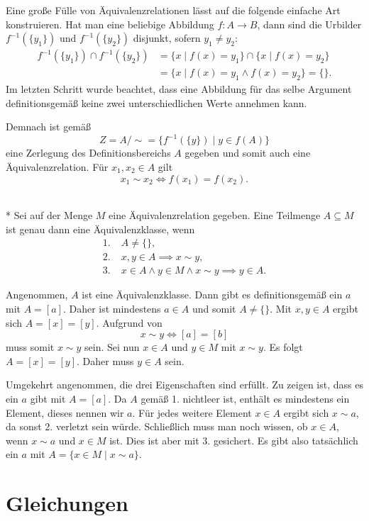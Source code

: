 Eine große Fülle von Äquivalenzrelationen lässt auf die folgende
einfache Art konstruieren. Hat man eine beliebige Abbildung
$f\colon A\to B$, dann sind die Urbilder $f^{-1}(\{y_1\})$ und
$f^{-1}(\{y_2\})$ disjunkt, sofern $y_1\ne y_2$:%
\begin{align*}
f^{-1}(\{y_1\})\cap f^{-1}(\{y_2\})
&= \{x\mid f(x)=y_1\}\cap\{x\mid f(x)=y_2\}\\
&= \{x\mid f(x)=y_1\land f(x)=y_2\} = \{\}.
\end{align*}
Im letzten Schritt wurde beachtet, dass eine Abbildung für
das selbe Argument definitionsgemäß keine zwei unterschiedlichen
Werte annehmen kann.

Demnach ist gemäß
\[Z = A/{\sim} = \{f^{-1}(\{y\})\mid y\in f(A)\}\]
eine Zerlegung des Definitionsbereichs $A$ gegeben und somit auch eine
Äquivalenzrelation. Für $x_1,x_2\in A$ gilt%
\[x_1\sim x_2 \iff f(x_1) = f(x_2).\]

\begin{Satz}\mbox{}\\*
Sei auf der Menge $M$ eine Äquivalenzrelation gegeben. Eine
Teilmenge $A\subseteq M$ ist genau dann eine Äquivalenzklasse,
wenn%
\begin{align*}
1.\;& A\ne\{\},\\
2.\;& x,y\in A\implies x\sim y,\\
3.\;& x\in A\land y\in M\land x\sim y\implies y\in A.
\end{align*}
\end{Satz}
 Angenommen, $A$ ist eine Äquivalenzklasse.
Dann gibt es definitionsgemäß ein $a$ mit $A=[a]$. Daher ist
mindestens $a\in A$ und somit $A\ne\{\}$. Mit $x,y\in A$ ergibt
sich $A=[x]=[y]$. Aufgrund von%
\[x\sim y \iff [a]=[b]\]
muss somit $x\sim y$ sein. Sei nun $x\in A$ und $y\in M$ mit
$x\sim y$. Es folgt $A=[x]=[y]$. Daher muss $y\in A$ sein.

Umgekehrt angenommen, die drei Eigenschaften sind erfüllt.
Zu zeigen ist, dass es ein $a$ gibt mit $A=[a]$. Da $A$ gemäß 1.
nichtleer ist, enthält es mindestens ein Element, dieses nennen wir
$a$. Für jedes weitere Element $x\in A$ ergibt sich
$x\sim a$, da sonst 2. verletzt sein würde. Schließlich muss man
noch wissen, ob $x\in A$, wenn $x\sim a$ und $x\in M$ ist.
Dies ist aber mit 3. gesichert. Es gibt also
tatsächlich ein $a$ mit $A=\{x\in M\mid x\sim a\}$.\;\qedsymbol

\newpage
\section{Gleichungen}
